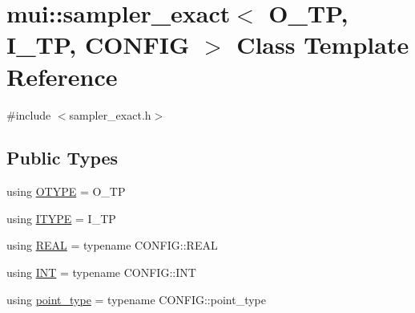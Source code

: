 \hypertarget{classmui_1_1sampler__exact}{}\section{mui\+:\+:sampler\+\_\+exact$<$ O\+\_\+\+TP, I\+\_\+\+TP, C\+O\+N\+F\+IG $>$ Class Template Reference}
\label{classmui_1_1sampler__exact}


{\ttfamily \#include $<$sampler\+\_\+exact.\+h$>$}

\subsection*{Public Types}
\begin{DoxyCompactItemize}
\item 
using \hyperlink{classmui_1_1sampler__exact_a7543e4be38b14fb93d07b34ee4e33f4d}{O\+T\+Y\+PE} = O\+\_\+\+TP
\item 
using \hyperlink{classmui_1_1sampler__exact_a4198aa2cc7c945895db91aae2b6cc0b2}{I\+T\+Y\+PE} = I\+\_\+\+TP
\item 
using \hyperlink{classmui_1_1sampler__exact_a204186f8735dcdfe021c7e3a36a077bf}{R\+E\+AL} = typename C\+O\+N\+F\+I\+G\+::\+R\+E\+AL
\item 
using \hyperlink{classmui_1_1sampler__exact_a94e324d5b0e9fb37c4dc011638d7a157}{I\+NT} = typename C\+O\+N\+F\+I\+G\+::\+I\+NT
\item 
using \hyperlink{classmui_1_1sampler__exact_a789e8bf4cf1dd6319c67ab7a60458948}{point\+\_\+type} = typename C\+O\+N\+F\+I\+G\+::point\+\_\+type
\end{DoxyCompactItemize}
